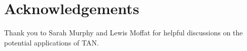 \documentclass{article}
\begin{document}
\section*{Acknowledgements}
Thank you to Sarah Murphy and Lewis Moffat for helpful discussions on the potential applications of TAN.




%
\end{document}
